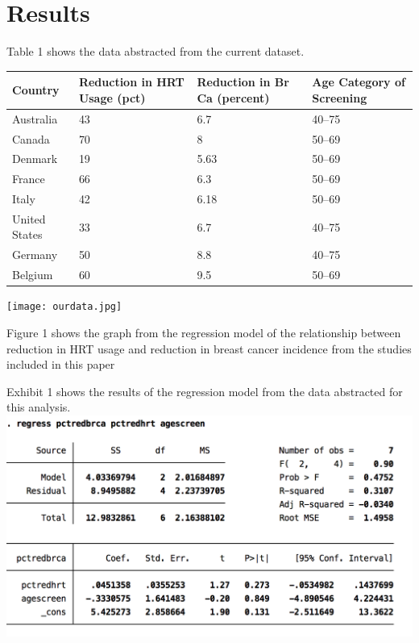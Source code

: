 \documentclass{article}
\begin{document}
\section*{Results}
\label{results}

Table 1 shows the data abstracted from the current dataset.

\begin{table}[htbp]
\begin{minipage}{\linewidth}
\setlength{\tymax}{0.5\linewidth}
\centering
\small
\begin{tabulary}{\textwidth}{@{}LLLL@{}} \toprule
Country&Reduction in HRT Usage (pct)&Reduction in Br Ca (percent)&Age Category of Screening\\
\midrule
Australia&43&6.7&40--75\\
Canada&70&8&50--69\\
Denmark&19&5.63&50--69\\
France&66&6.3&50--69\\
Italy&42&6.18&50--69\\
United States&33&6.7&40--75\\
Germany&50&8.8&40--75\\
Belgium&60&9.5&50--69\\

\bottomrule

\end{tabulary}
\end{minipage}
\end{table}


\texttt{[image: ourdata.jpg]}

Figure 1 shows the graph from the regression model of the relationship between reduction in HRT usage and reduction in breast cancer incidence from the studies included in this paper

Exhibit 1 shows the results of the regression model from the data abstracted for this analysis.
\includegraphics[keepaspectratio,width=\textwidth,height=0.75\textheight]{ourfigure.png}
\end{document}
